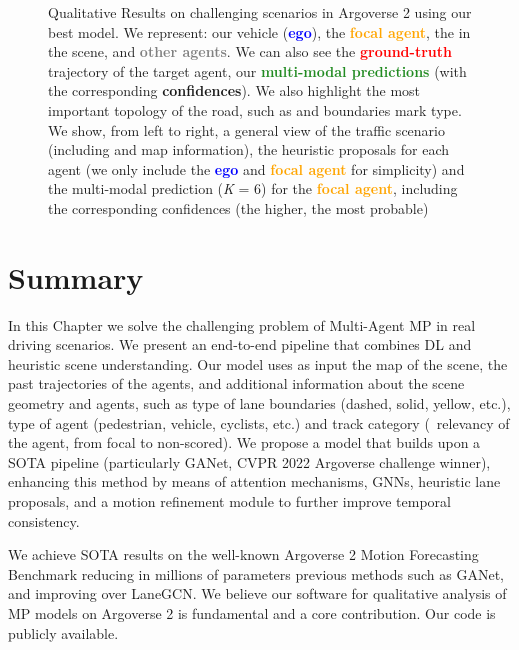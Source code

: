 \begin{figure}[h]
	\caption[Qualitative Results on challenging scenarios in Argoverse 2 using our best model]{Qualitative Results on challenging scenarios in Argoverse 2 using our best model. We represent: our vehicle (\textbf{\textcolor{blue}{ego}}), the \textbf{\textcolor{orange}{focal agent}}, the \textbf{\color{blue-violet}{relevant agents}} in the scene, and \textbf{\textcolor{gray}{other agents}}. We can also see the \textbf{\textcolor{red}{ground-truth}} trajectory of the target agent, our \textbf{\textcolor{ForestGreen}{multi-modal predictions}} (with the corresponding \textbf{confidences}). We also highlight the most important topology of the road, such as {\color{blue-violet}{pedestrian crossing}} and boundaries mark type. We show, from left to right, a general view of the traffic scenario (including and map information), the heuristic proposals for each agent (we only include the \textbf{\textcolor{blue}{ego}} and \textbf{\textcolor{orange}{focal agent}} for simplicity) and the multi-modal prediction (\textit{K} = 6) for the \textbf{\textcolor{orange}{focal agent}}, including the corresponding confidences (the higher, the most probable)}
	\label{fig:chapter_7_Improving_Multi_Agent/argoverse_2_qualitative_results}
\end{figure}

\section{Summary}
\label{sec:7_summary}


In this Chapter we solve the challenging problem of Multi-Agent \ac{MP} in real driving scenarios. We present an end-to-end pipeline that combines \ac{DL} and heuristic scene understanding. Our model uses as input the map of the scene, the past trajectories of the agents, and additional information about the scene geometry and agents, such as type of lane boundaries (dashed, solid, yellow, etc.), type of agent (pedestrian, vehicle, cyclists, etc.) and track category (\ie \ relevancy of the agent, from focal to non-scored). We propose a model that builds upon a \ac{SOTA} pipeline (particularly GANet, CVPR 2022 Argoverse challenge winner), enhancing this method by means of attention mechanisms, \acp{GNN}, heuristic lane proposals, and a motion refinement module to further improve temporal consistency. 

We achieve \ac{SOTA} results on the well-known Argoverse 2 Motion Forecasting Benchmark reducing in millions of parameters previous methods such as GANet, and improving over LaneGCN. We believe our software for qualitative analysis of \ac{MP} models on Argoverse 2 is fundamental and a core contribution. Our code is publicly available.